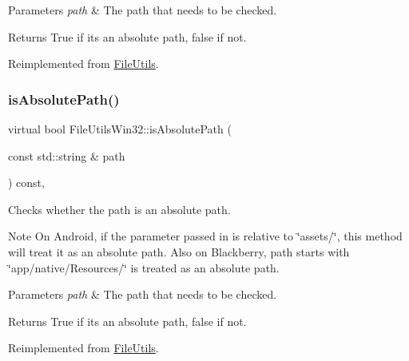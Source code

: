 \begin{DoxyParams}{Parameters}
{\em path} & The path that needs to be checked. \\
\hline
\end{DoxyParams}
\begin{DoxyReturn}{Returns}
True if it\textquotesingle{}s an absolute path, false if not. 
\end{DoxyReturn}


Reimplemented from \hyperlink{classFileUtils_aed08c5ac2854f3fb5c104386ab96a90c}{File\+Utils}.

\mbox{\label{classFileUtilsWin32_ab4ecf27c8feb35aee8894ca39d559fd7}} 
\subsubsection{\texorpdfstring{is\+Absolute\+Path()}{isAbsolutePath()}\hspace{0.1cm}{\footnotesize\ttfamily [2/2]}}
{\footnotesize\ttfamily virtual bool File\+Utils\+Win32\+::is\+Absolute\+Path (\begin{DoxyParamCaption}\item[{const std\+::string \&}]{path }\end{DoxyParamCaption}) const\hspace{0.3cm}{\ttfamily [override]}, {\ttfamily [virtual]}}

Checks whether the path is an absolute path.

\begin{DoxyNote}{Note}
On Android, if the parameter passed in is relative to \char`\"{}assets/\char`\"{}, this method will treat it as an absolute path. Also on Blackberry, path starts with \char`\"{}app/native/\+Resources/\char`\"{} is treated as an absolute path.
\end{DoxyNote}

\begin{DoxyParams}{Parameters}
{\em path} & The path that needs to be checked. \\
\hline
\end{DoxyParams}
\begin{DoxyReturn}{Returns}
True if it\textquotesingle{}s an absolute path, false if not. 
\end{DoxyReturn}


Reimplemented from \hyperlink{classFileUtils_aed08c5ac2854f3fb5c104386ab96a90c}{File\+Utils}.

